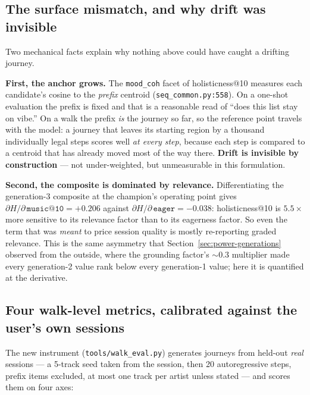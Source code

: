 \documentclass[11pt]{article}
\begin{document}
\subsection{The surface mismatch, and why drift was invisible}
\label{sec:walk-mismatch}
Two mechanical facts explain why nothing above could have caught a drifting
journey.

\textbf{First, the anchor grows.} The \texttt{mood\_coh} facet of
holisticness@10 measures each candidate's cosine to the \emph{prefix} centroid
(\texttt{seq\_common.py:558}). On a one-shot evaluation the prefix is fixed and
that is a reasonable read of ``does this list stay on vibe.'' On a walk the
prefix \emph{is} the journey so far, so the reference point travels with the
model: a journey that leaves its starting region by a thousand individually
legal steps scores well \emph{at every step}, because each step is compared to a
centroid that has already moved most of the way there. \textbf{Drift is
invisible by construction} --- not under-weighted, but unmeasurable in this
formulation.

\textbf{Second, the composite is dominated by relevance.} Differentiating the
generation-3 composite at the champion's operating point gives
$\partial H/\partial\,\texttt{music@10} = +\num{0.206}$ against
$\partial H/\partial\,\texttt{eager} = -\num{0.038}$: holisticness@10 is
$\num{5.5}\times$ more sensitive to its relevance factor than to its eagerness
factor. So even the term that was \emph{meant} to price session quality is
mostly re-reporting graded relevance. This is the same asymmetry that
Section~\ref{sec:power-generations} observed from the outside, where the
grounding factor's ${\sim}0.3$ multiplier made every generation-2 value rank
below every generation-1 value; here it is quantified at the derivative.

\subsection{Four walk-level metrics, calibrated against the user's own sessions}
\label{sec:walk-metrics}
The new instrument (\texttt{tools/walk\_eval.py}) generates journeys from
held-out \emph{real} sessions --- a 5-track seed taken from the session, then 20
autoregressive steps, prefix items excluded, at most one track per artist unless
stated --- and scores them on four axes:
\end{document}

